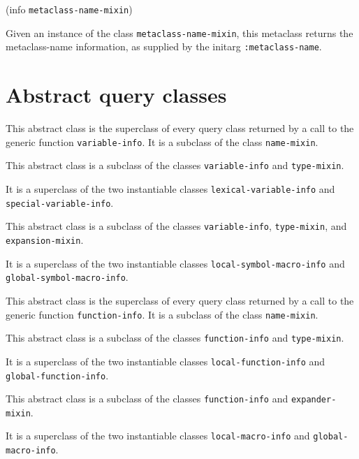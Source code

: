  {(info {\tt metaclass-name-mixin})}

Given an instance of the class \texttt{metaclass-name-mixin}, this
metaclass returns the metaclass-name information, as supplied by the
initarg \texttt{:metaclass-name}.

\section{Abstract query classes}


This abstract class is the superclass of every query class returned by
a call to the generic function \texttt{variable-info}.  It is a
subclass of the class \texttt{name-mixin}.


This abstract class is a subclass of the classes
\texttt{variable-info} and \texttt{type-mixin}.

It is a superclass of the two instantiable classes
\texttt{lexical-variable-info} and
\texttt{special-variable-info}.


This abstract class is a subclass of the classes
\texttt{variable-info}, \texttt{type-mixin}, and
\texttt{expansion-mixin}.

It is a superclass of the two instantiable classes
\texttt{local-symbol-macro-info} and
\texttt{global-symbol-macro-info}.


This abstract class is the superclass of every query class returned by
a call to the generic function \texttt{function-info}.  It is a
subclass of the class \texttt{name-mixin}.


This abstract class is a subclass of the classes
\texttt{function-info} and \texttt{type-mixin}.

It is a superclass of the two instantiable classes
\texttt{local-function-info} and
\texttt{global-function-info}.


This abstract class is a subclass of the classes
\texttt{function-info} and \texttt{expander-mixin}.

It is a superclass of the two instantiable classes
\texttt{local-macro-info} and
\texttt{global-macro-info}.

